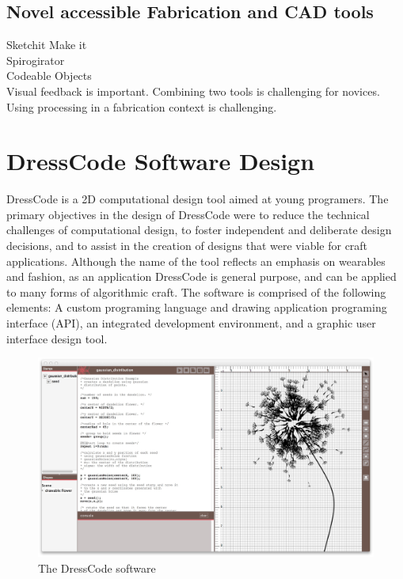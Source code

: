 \documentclass{sigchi}
\begin{document}
\subsection{Novel accessible Fabrication and CAD tools}
Sketchit Make it\\
Spirogirator\\
Codeable Objects\\

Visual feedback is important. Combining two tools is challenging for novices. Using processing in a fabrication context is challenging.

\section{DressCode Software Design}
DressCode is a 2D computational design tool aimed at young programers. The primary objectives in the design of DressCode were to reduce the technical challenges of computational design, to foster independent and deliberate design decisions, and to assist in the creation of designs that were viable for craft applications. Although the name of the tool reflects an emphasis on wearables and fashion, as an application DressCode is general purpose, and can be applied to many forms of algorithmic craft. The software is comprised of the following elements: A custom programing language and drawing application programing interface (API), an integrated development environment, and a graphic user interface design tool. 
\begin{center}
\begin{figure}[h!]
\includegraphics[width=\columnwidth]{images/dresscode_interface.jpg}
\caption{The DressCode software}
\label{fig:dresscode_interface}
\end{figure}
\end{center}
\end{document}
